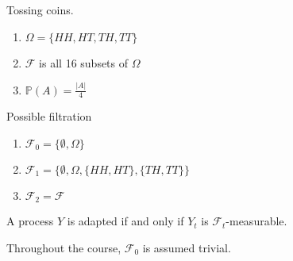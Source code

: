 \begin{exmp}
  Tossing coins.
  \begin{enumerate}
  \item $\Omega = \{ HH, HT, TH, TT \}$
  \item $\mathcal{F}$ is all 16 subsets of $\Omega$
  \item $\mathbb{P}(A) = \frac{|A|}{4}$
  \end{enumerate}

  Possible filtration
  \begin{enumerate}
  \item $\mathcal{F}_{0} = \{ \emptyset, \Omega \}$
  \item $\mathcal{F}_{1} = \{ \emptyset, \Omega, \{ HH, HT \}, \{ TH,
    TT \} \}$
  \item $\mathcal{F}_{2} = \mathcal{F}$
  \end{enumerate}
\end{exmp}

\begin{defn}
  \label{defn:4}
  A process $Y$ is adapted if and only if $Y_{t}$ is $\mathcal{F}_{t}$-measurable.
\end{defn}

Throughout the course, $\mathcal{F}_{0}$ is assumed trivial.

